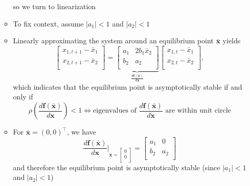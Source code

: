 \documentclass[12pt,a4paper]{article}
\begin{document}
\begin{itemize}
\begin{itemize}
    so we turn to linearization
  \item To fix context, assume $|a_{1}|<1$ and $|a_{2}|<1$
  \item Linearly approximating the system around an equilibrium point $\bar{\bm{x}}$ yields
    \begin{equation}\nonumber%
      \begin{bmatrix}
        x_{1,t+1} - \bar{x}_{1} \\
        x_{2,t+1} - \bar{x}_{2} \\
      \end{bmatrix}
      =
      \underbrace{
      \begin{bmatrix}
      a_{1} & 2b_{1}\bar{x}_{2} \\
      b_{2} & a_{2} \\
      \end{bmatrix}}_{\frac{d\bm{f}(\bar{\bm{x}})}{d\bm{x}}}
      \begin{bmatrix}
      x_{1,t} - \bar{x}_{1} \\
      x_{2,t} - \bar{x}_{2} \\
      \end{bmatrix},
    \end{equation}
    which indicates that the equilibrium point is asymptotically stable
    if and only if
    \begin{equation}\nonumber%
      \rho \left(\frac{d\bm{f}(\bar{\bm{x}})}{d\bm{x}}\right) < 1
      \iff
      \text{eigenvalues of $\frac{d\bm{f}(\bar{\bm{x}})}{d\bm{x}}$ are within unit circle}
    \end{equation}

  \item For $\bar{\bm{x}}=(0, 0)^{\top}$, we have
    \begin{equation}\nonumber%
      \frac{d\bm{f}(\bar{\bm{x}})}{d\bm{x}}\bigg|_{
        \bar{\bm{x}}=
        \begin{bmatrix}
          0 \\
          0 \\
        \end{bmatrix}
      }
      =
      \begin{bmatrix}
        a_{1} & 0 \\
        b_{2} & a_{2} \\
      \end{bmatrix}
    \end{equation}
    and therefore
    the equilibrium point is asymptotically stable (since $|a_{1}|<1$ and $|a_{2}|<1$)


\end{itemize}
\end{itemize}
\end{document}
